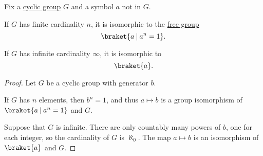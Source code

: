 \begin{proposition}\label{thm:cyclic_group_classification}
  Fix a \hyperref[def:cyclic_group]{cyclic group} \( G \) and a symbol \( a \) not in \( G \).

  \begin{thmenum}
     If \( G \) has finite cardinality \( n \), it is isomorphic to the \hyperref[def:free_group]{free group}
    \begin{equation}\label{eq:thm:cyclic_group_classification/finite}
      \braket{ a \given a^n = 1 }.
    \end{equation}

     If \( G \) has infinite cardinality \( \infty \), it is isomorphic to
    \begin{equation}\label{eq:thm:cyclic_group_classification/infinite}
      \braket{ a }.
    \end{equation}
  \end{thmenum}
\end{proposition}
\begin{proof}
  Let \( G \) be a cyclic group with generator \( b \).

   If \( G \) has \( n \) elements, then \( b^n = 1 \), and thus \( a \mapsto b \) is a group isomorphism of \( \braket{ a \given a^n = 1 } \) and \( G \).

   Suppose that \( G \) is infinite. There are only countably many powers of \( b \), one for each integer, so the cardinality of \( G \) is \( \aleph_0 \). The map \( a \mapsto b \) is an isomorphism of \( \braket{ a } \) and \( G \).
\end{proof}

